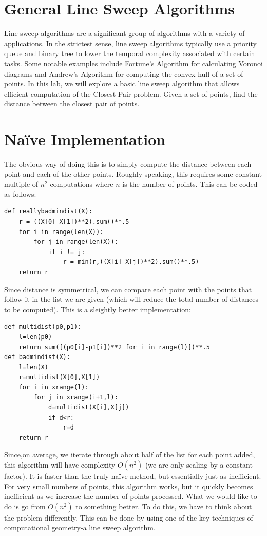 

\section*{General Line Sweep Algorithms}

Line sweep algorithms are a significant group of algorithms with a variety of applications. 
In the strictest sense, line sweep algorithms typically use a priority queue and binary tree to lower the temporal complexity associated with certain tasks. 
Some notable examples include Fortune's Algorithm for calculating Voronoi diagrams and Andrew's Algorithm for computing the convex hull of a set of points. 
In this lab, we will explore a basic line sweep algorithm that allows efficient computation of the Closest Pair problem.  
Given a set of points, find the distance between the closest pair of points.

\section*{Na\"ive Implementation}

The obvious way of doing this is to simply compute the distance between each point and each of the other points.
Roughly speaking, this requires some constant multiple of $n^2$ computations where $n$ is the number of points.
This can be coded as follows:
\begin{lstlisting}
def reallybadmindist(X):
    r = ((X[0]-X[1])**2).sum()**.5
    for i in range(len(X)):
        for j in range(len(X)):
            if i != j:
                r = min(r,((X[i]-X[j])**2).sum()**.5)
    return r
\end{lstlisting}
Since distance is symmetrical, we can compare each point with the points that follow it in the list we are given (which will reduce
the total number of distances to be computed).
This is a sleightly better implementation:
\begin{lstlisting}
def multidist(p0,p1):
    l=len(p0)
    return sum([(p0[i]-p1[i])**2 for i in range(l)])**.5
def badmindist(X):
    l=len(X)
    r=multidist(X[0],X[1])
    for i in xrange(l):
        for j in xrange(i+1,l):
            d=multidist(X[i],X[j])
            if d<r:
                r=d
    return r
\end{lstlisting}

Since,on average, we iterate through about half of the list for each point added, this algorithm will have complexity $O(n^2)$ (we are only scaling by a constant factor).  
It is faster than the truly na\"ive method, but essentially just as inefficient.
For very small numbers of points, this algorithm works, but it quickly becomes inefficient as we increase the number of points processed.  
What we would like to do is go from $O(n^2)$ to something better.  
To do this, we have to think about the problem differently.
This can be done by using one of the key techniques of computational geometry-a line sweep algorithm.

